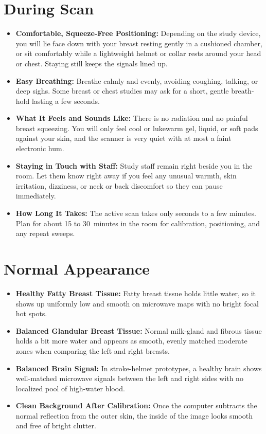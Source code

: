 \section{During Scan}
\begin{itemize}
  \item \textbf{Comfortable, Squeeze-Free Positioning:} Depending on the study device, you will lie face down with your breast resting gently in a cushioned chamber, or sit comfortably while a lightweight helmet or collar rests around your head or chest. Staying still keeps the signals lined up.
  \item \textbf{Easy Breathing:} Breathe calmly and evenly, avoiding coughing, talking, or deep sighs. Some breast or chest studies may ask for a short, gentle breath-hold lasting a few seconds.
  \item \textbf{What It Feels and Sounds Like:} There is no radiation and no painful breast squeezing. You will only feel cool or lukewarm gel, liquid, or soft pads against your skin, and the scanner is very quiet with at most a faint electronic hum.
  \item \textbf{Staying in Touch with Staff:} Study staff remain right beside you in the room. Let them know right away if you feel any unusual warmth, skin irritation, dizziness, or neck or back discomfort so they can pause immediately.
  \item \textbf{How Long It Takes:} The active scan takes only seconds to a few minutes. Plan for about 15 to 30~minutes in the room for calibration, positioning, and any repeat sweeps.
\end{itemize}

\section{Normal Appearance}
\begin{itemize}
  \item \textbf{Healthy Fatty Breast Tissue:} Fatty breast tissue holds little water, so it shows up uniformly low and smooth on microwave maps with no bright focal hot spots.
  \item \textbf{Balanced Glandular Breast Tissue:} Normal milk-gland and fibrous tissue holds a bit more water and appears as smooth, evenly matched moderate zones when comparing the left and right breasts.
  \item \textbf{Balanced Brain Signal:} In stroke-helmet prototypes, a healthy brain shows well-matched microwave signals between the left and right sides with no localized pool of high-water blood.
  \item \textbf{Clean Background After Calibration:} Once the computer subtracts the normal reflection from the outer skin, the inside of the image looks smooth and free of bright clutter.
\end{itemize}

